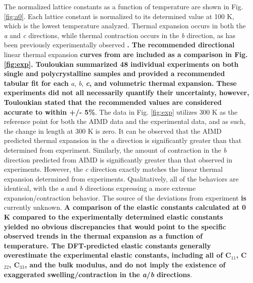 \documentclass[utf8]{frontiersSCNS} %
\providecommand{\DIFaddtex}[1]{{\bf #1}} %
\providecommand{\DIFdeltex}[1]{} %
\providecommand{\DIFaddbegin}{\protect\color{blue}} %
\providecommand{\DIFaddend}{\protect\color{black}} %
\providecommand{\DIFdelbegin}{\protect\color{red}} %
\providecommand{\DIFdelend}{\protect\color{black}} %
\providecommand{\DIFadd}[1]{\texorpdfstring{\DIFaddtex{#1}}{#1}} %
\providecommand{\DIFdel}[1]{\texorpdfstring{\DIFdeltex{#1}}{}} %
\begin{document}
The normalized lattice constants as a function of temperature are shown in Fig. \ref{fig:a0}. Each lattice constant is normalized to its determined value at 100 K, which is the lowest temperature analyzed. Thermal expansion occurs in both the \textit{a} and \textit{c} directions, while thermal contraction occurs in the \textit{b} direction, as has been previously experimentally observed \DIFdelbegin \DIFdel{\cite{grenthe2010}. Average values for }\DIFdelend \DIFaddbegin \DIFadd{\cite{touloukian}. The recommended directional }\DIFaddend linear thermal expansion \DIFdelbegin \DIFdel{coefficients of $\alpha$-U for the }\DIFdelend \DIFaddbegin \DIFadd{curves from \cite{touloukian} are included as a comparison in Fig. \ref{fig:exp}. Touloukian summarized 48 individual experiments on both single and polycrystalline samples and provided a recommended tabular fit for each }\DIFaddend \textit{a}, \textit{b}, \DIFdelbegin \DIFdel{and \textit{c}crystallographic directions were experimentally determined to be 26.5$\times$10$^{-6}$ K$^{-1}$, \mbox{-2.4$\times$10$^{-6}$ K$^{-1}$}, and 23.9$\times$10$^{-6}$ K$^{-1}$, respectively, over the temperature range of 298-598 K \cite{grenthe2010, lloyd1966}}\DIFdelend \DIFaddbegin \DIFadd{\textit{c}, and volumetric thermal expansion. These experiments did not all necessarily quantify their uncertainty, however, Touloukian stated that the recommended values are considered accurate to within +/- 5\%}\DIFaddend . The data in Fig. \ref{fig:exp} utilizes 300 K as the reference point for both the AIMD data and the experimental data, and as such, the change in length at 300 K is zero. It can be observed that the AIMD predicted thermal expansion in the \textit{a} direction is significantly greater than that determined from experiment. Similarly, the amount of contraction in the \textit{b} direction predicted from AIMD is significantly greater than that observed in experiments. However, the \textit{c} direction exactly matches the linear thermal expansion determined from experiments. Qualitatively, all of the behaviors are identical, with the \textit{a} and \textit{b} directions expressing a more extreme expansion/contraction behavior. The source of the deviations from experiment \DIFdelbegin \DIFdel{are }\DIFdelend \DIFaddbegin \DIFadd{is }\DIFaddend currently unknown. \DIFdelbegin \DIFdel{It should be noted that significant scatter exists in the experimental datasets utilized to generate the averages presented for comparison in Fig. \ref{fig:exp}, and additional experimental investigations are warranted in order to confirm previous findings}\DIFdelend \DIFaddbegin \DIFadd{A comparison of the elastic constants calculated at 0 K \cite{beeler2013}compared to the experimentally determined elastic constants \cite{fisher1958} yielded no obvious discrepancies that would point to the specific observed trends in the thermal expansion as a function of temperature. The DFT-predicted elastic constants generally overestimate the experimental elastic constants, including all of C$_{11}$, C$_{22}$, C$_{33}$, and the bulk modulus, and do not imply the existence of exaggerated swelling/contraction in the \textit{a}/\textit{b} directions}\DIFaddend .
\end{document}
